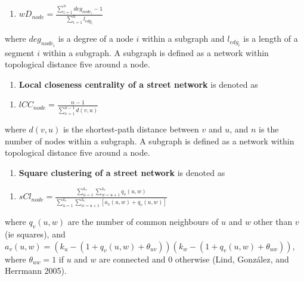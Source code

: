 \documentclass[
  letterpaper,
  DIV=11,
  numbers=noendperiod]{scrartcl}
\providecommand{\tightlist}{%
  \setlength{\itemsep}{0pt}\setlength{\parskip}{0pt}}\usepackage{longtable,booktabs,array}
\begin{document}
\begin{enumerate}
\def\labelenumi{(\arabic{enumi})}
\setcounter{enumi}{49}
\tightlist
\item
  \(wD_{node} = \frac{\sum_{i=1}^{n} deg_{node_i} - 1}{\sum_{i=1}^{n} l_{edg_i}}\)
\end{enumerate}

where \(deg_{node_i}\) is a degree of a node \(i\) within a subgraph and
\(l_{edg_i}\) is a length of a segment \(i\) within a subgraph. A
subgraph is defined as a network within topological distance five around
a node.

\begin{enumerate}
\def\labelenumi{\arabic{enumi}.}
\setcounter{enumi}{50}
\tightlist
\item
  \textbf{Local closeness centrality of a street network} is denoted as
\end{enumerate}

\begin{enumerate}
\def\labelenumi{(\arabic{enumi})}
\setcounter{enumi}{50}
\tightlist
\item
  \(lCC_{node} = \frac{n - 1}{\sum_{v=1}^{n-1} d(v, u)}\)
\end{enumerate}

where \(d(v, u)\) is the shortest-path distance between \(v\) and \(u\),
and \(n\) is the number of nodes within a subgraph. A subgraph is
defined as a network within topological distance five around a node.

\begin{enumerate}
\def\labelenumi{\arabic{enumi}.}
\setcounter{enumi}{51}
\tightlist
\item
  \textbf{Square clustering of a street network} is denoted as
\end{enumerate}

\begin{enumerate}
\def\labelenumi{(\arabic{enumi})}
\setcounter{enumi}{51}
\tightlist
\item
  \(sCl_{node} = \frac{\sum_{u=1}^{k_{v}} \sum_{w=u+1}^{k_{v}} q_{v}(u, w)}{\sum_{u=1}^{k_{v}} \sum_{w=u+1}^{k_{v}}\left[a_{v}(u, w)+q_{v}(u, w)\right]}\)
\end{enumerate}

where \(q_v(u,w)\) are the number of common neighbours of \(u\) and
\(w\) other than \(v\) (ie squares), and
\(a_v(u,w) = (k_u - (1+q_v(u,w)+\theta_{uv}))(k_w - (1+q_v(u,w)+\theta_{uw}))\),
where \(\theta_{uw} = 1\) if \(u\) and \(w\) are connected and 0
otherwise (Lind, González, and Herrmann 2005).
\end{document}
